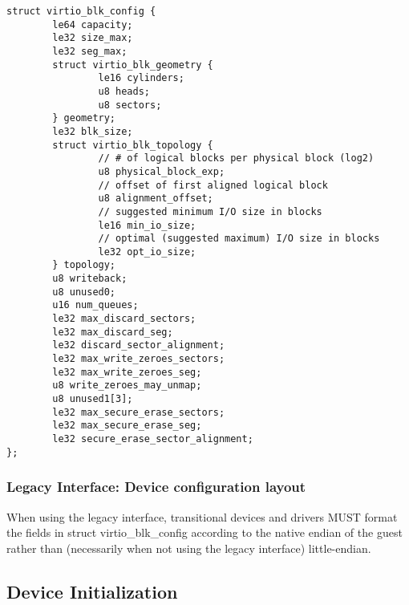 \begin{lstlisting}
struct virtio_blk_config {
        le64 capacity;
        le32 size_max;
        le32 seg_max;
        struct virtio_blk_geometry {
                le16 cylinders;
                u8 heads;
                u8 sectors;
        } geometry;
        le32 blk_size;
        struct virtio_blk_topology {
                // # of logical blocks per physical block (log2)
                u8 physical_block_exp;
                // offset of first aligned logical block
                u8 alignment_offset;
                // suggested minimum I/O size in blocks
                le16 min_io_size;
                // optimal (suggested maximum) I/O size in blocks
                le32 opt_io_size;
        } topology;
        u8 writeback;
        u8 unused0;
        u16 num_queues;
        le32 max_discard_sectors;
        le32 max_discard_seg;
        le32 discard_sector_alignment;
        le32 max_write_zeroes_sectors;
        le32 max_write_zeroes_seg;
        u8 write_zeroes_may_unmap;
        u8 unused1[3];
        le32 max_secure_erase_sectors;
        le32 max_secure_erase_seg;
        le32 secure_erase_sector_alignment;
};
\end{lstlisting}


\subsubsection{Legacy Interface: Device configuration layout}\label{sec:Device Types / Block Device / Device configuration layout / Legacy Interface: Device configuration layout}
When using the legacy interface, transitional devices and drivers
MUST format the fields in struct virtio_blk_config
according to the native endian of the guest rather than
(necessarily when not using the legacy interface) little-endian.


\subsection{Device Initialization}\label{sec:Device Types / Block Device / Device Initialization}

